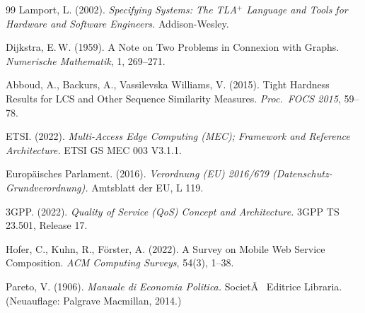 ﻿\documentclass[a4paper,12pt]{article}
\theoremstyle{definition}
\begin{document}
\begin{thebibliography}{99}
Lamport, L. (2002). \textit{Specifying Systems: The TLA$^+$ Language and Tools for Hardware and Software Engineers.} Addison-Wesley.

Dijkstra, E.\,W. (1959). A Note on Two Problems in Connexion with Graphs. \textit{Numerische Mathematik}, 1, 269--271.

Abboud, A., Backurs, A., Vassilevska Williams, V. (2015). Tight Hardness Results for LCS and Other Sequence Similarity Measures. \textit{Proc.\ FOCS 2015}, 59--78.

ETSI. (2022). \textit{Multi-Access Edge Computing (MEC); Framework and Reference Architecture.} ETSI GS MEC 003 V3.1.1.

Europäisches Parlament. (2016). \textit{Verordnung (EU) 2016/679 (Datenschutz-Grundverordnung).} Amtsblatt der EU, L 119.

3GPP. (2022). \textit{Quality of Service (QoS) Concept and Architecture.} 3GPP TS 23.501, Release 17.

Hofer, C., Kuhn, R., Förster, A. (2022). A Survey on Mobile Web Service Composition. \textit{ACM Computing Surveys}, 54(3), 1--38.

Pareto, V. (1906). \textit{Manuale di Economia Politica.} SocietÃ  Editrice Libraria. (Neuauflage: Palgrave Macmillan, 2014.)

\end{thebibliography}
\end{document}
